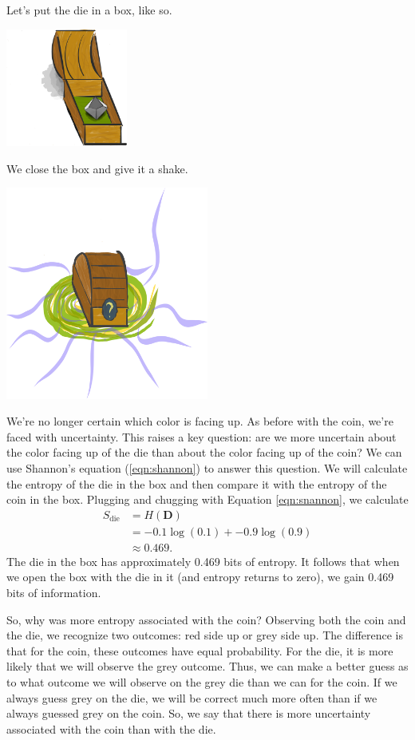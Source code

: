 Let's put the die in a box, like so.
\begin{center}
\includegraphics[width=0.3\textwidth]{img/small-box-open-die}
\end{center}
We close the box and give it a shake.
\begin{center}
\includegraphics[width=0.5\textwidth]{img/small-box-closed-portal}
\end{center}
We're no longer certain which color is facing up.
As before with the coin, we're faced with uncertainty.
This raises a key question: are we more uncertain about the color facing up of the die than about the color facing up of the coin?
We can use Shannon's equation (\ref{eqn:shannon}) to answer this question.
We will calculate the entropy of the die in the box and then compare it with the entropy of the coin in the box.
Plugging and chugging with Equation \ref{eqn:snannon}, we calculate
\begin{align*}
S_{\text{die}}
&= H(\bm{D}) \\
&= -0.1 \log(0.1) + -0.9 \log(0.9) \\
&\approx 0.469.
\end{align*}
The die in the box has approximately 0.469 bits of entropy.
It follows that when we open the box with the die in it (and entropy returns to zero), we gain 0.469 bits of information.

So, why was more entropy associated with the coin?
Observing both the coin and the die, we recognize two outcomes: red side up or grey side up.
The difference is that for the coin, these outcomes have equal probability.
For the die, it is more likely that we will observe the grey outcome.
Thus, we can make a better guess as to what outcome we will observe on the grey die than we can for the coin.
If we always guess grey on the die, we will be correct much more often than if we always guessed grey on the coin.
So, we say that there is more uncertainty associated with the coin than with the die.
